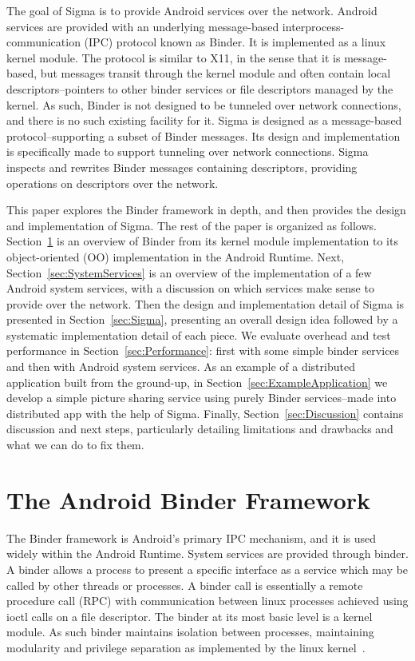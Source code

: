 \documentclass[prodmode]{acmlarge}
\begin{document}
The goal of Sigma is to provide Android services over the network. Android services are provided with an underlying message-based interprocess-communication (IPC) protocol known as Binder. It is implemented as a linux kernel module. The protocol is similar to X11, in the sense that it is message-based, but messages transit through the kernel module and often contain local descriptors--pointers to other binder services or file descriptors managed by the kernel. As such, Binder is not designed to be tunneled over network connections, and there is no such existing facility for it. Sigma is designed as a message-based protocol--supporting a subset of Binder messages. Its design and implementation is specifically made to support tunneling over network connections. Sigma inspects and rewrites Binder messages containing descriptors, providing operations on descriptors over the network.

This paper explores the Binder framework in depth, and then provides the design and implementation of Sigma. The rest of the paper is organized as follows. Section~\ref{sec:AndroidBinderFramework} is an overview of Binder from its kernel module implementation to its object-oriented (OO) implementation in the Android Runtime. Next, Section~\ref{sec:SystemServices} is an overview of the implementation of a few Android system services, with a discussion on which services make sense to provide over the network. Then the design and implementation detail of Sigma is presented in Section~\ref{sec:Sigma}, presenting an overall design idea followed by a systematic implementation detail of each piece. We evaluate overhead and test performance in Section~\ref{sec:Performance}: first with some simple binder services and then with Android system services. As an example of a distributed application built from the ground-up, in Section~\ref{sec:ExampleApplication} we develop a simple picture sharing service using purely Binder services--made into distributed app with the help of Sigma. Finally, Section~\ref{sec:Discussion} contains discussion and next steps, particularly detailing limitations and drawbacks and what we can do to fix them.

\section{The Android Binder Framework}
\label{sec:AndroidBinderFramework}
The Binder framework is Android's primary IPC mechanism, and it is used widely within the Android Runtime. System services are provided through binder. A binder allows a process to present a specific interface as a service which may be called by other threads or processes. A binder call is essentially a remote procedure call (RPC) with communication between linux processes achieved using ioctl calls on a file descriptor. The binder at its most basic level is a kernel module. As such binder maintains isolation between processes, maintaining modularity and privilege separation as implemented by the linux kernel~\cite{OpenBinder}.
\end{document}
